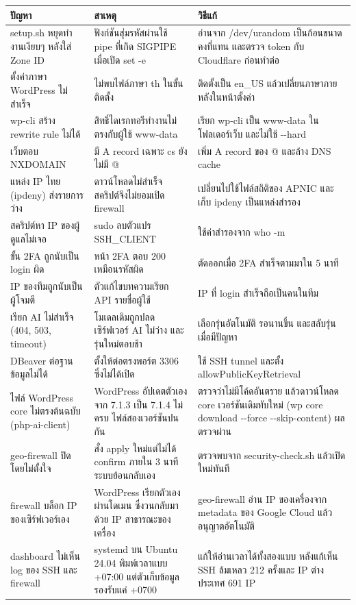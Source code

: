 \begingroup\small\begin{longtable}[]{@{}>{\raggedright\arraybackslash}p{}>{\raggedright\arraybackslash}p{}>{\raggedright\arraybackslash}p{}@{}}
\toprule\noalign{}
ปัญหา & สาเหตุ & วิธีแก้ \\
\midrule\noalign{}
\endhead
\bottomrule\noalign{}
\endlastfoot
setup.sh หยุดทำงานเงียบๆ หลังใส่ Zone ID & ฟังก์ชันสุ่มรหัสผ่านใช้ pipe ที่เกิด SIGPIPE เมื่อเปิด set -e & อ่านจาก /dev/urandom เป็นก้อนขนาดคงที่แทน และตรวจ token กับ Cloudflare ก่อนทำต่อ \\
ตั้งค่าภาษา WordPress ไม่สำเร็จ & ไม่พบไฟล์ภาษา th ในขั้นติดตั้ง & ติดตั้งเป็น en\_US แล้วเปลี่ยนภาษาภายหลังในหน้าตั้งค่า \\
wp-cli สร้าง rewrite rule ไม่ได้ & สิทธิ์ไดเรกทอรีทำงานไม่ตรงกับผู้ใช้ www-data & เรียก wp-cli เป็น www-data ในโฟลเดอร์เว็บ และไม่ใช้ -\/-hard \\
เว็บตอบ NXDOMAIN & มี A record เฉพาะ cs ยังไม่มี @ & เพิ่ม A record ของ @ และล้าง DNS cache \\
แหล่ง IP ไทย (ipdeny) ส่งรายการว่าง & ดาวน์โหลดไม่สำเร็จ สคริปต์จึงไม่ยอมเปิด firewall & เปลี่ยนไปใช้ไฟล์สถิติของ APNIC และเก็บ ipdeny เป็นแหล่งสำรอง \\
สคริปต์หา IP ของผู้ดูแลไม่เจอ & sudo ลบตัวแปร SSH\_CLIENT & ใช้ค่าสำรองจาก who -m \\
ขั้น 2FA ถูกนับเป็น login ผิด & หน้า 2FA ตอบ 200 เหมือนรหัสผิด & ตัดออกเมื่อ 2FA สำเร็จตามมาใน 5 นาที \\
IP ของทีมถูกนับเป็นผู้โจมตี & ตัวแก้ไขบทความเรียก API รายชื่อผู้ใช้ & IP ที่ login สำเร็จถือเป็นคนในทีม \\
เรียก AI ไม่สำเร็จ (404, 503, timeout) & โมเดลเดิมถูกปลด เซิร์ฟเวอร์ AI ไม่ว่าง และรุ่นใหม่ตอบช้า & เลือกรุ่นอัตโนมัติ รอนานขึ้น และสลับรุ่นเมื่อมีปัญหา \\
DBeaver ต่อฐานข้อมูลไม่ได้ & ตั้งให้ต่อตรงพอร์ต 3306 ซึ่งไม่ได้เปิด & ใช้ SSH tunnel และตั้ง allowPublicKeyRetrieval \\
ไฟล์ WordPress core ไม่ตรงต้นฉบับ (php-ai-client) & WordPress อัปเดตตัวเองจาก 7.1.3 เป็น 7.1.4 ไม่ครบ ไฟล์สองเวอร์ชันปนกัน & ตรวจว่าไม่มีโค้ดอันตราย แล้วดาวน์โหลด core เวอร์ชันเดิมทับใหม่ (wp core download -\/-force -\/-skip-content) ผลตรวจผ่าน \\
geo-firewall ปิดโดยไม่ตั้งใจ & สั่ง apply ใหม่แต่ไม่ได้ confirm ภายใน 3 นาที ระบบย้อนกลับเอง & ตรวจพบจาก security-check.sh แล้วเปิดใหม่ทันที \\
firewall บล็อก IP ของเซิร์ฟเวอร์เอง & WordPress เรียกตัวเองผ่านโดเมน ซึ่งวนกลับมาด้วย IP สาธารณะของเครื่อง & geo-firewall อ่าน IP ของเครื่องจาก metadata ของ Google Cloud แล้วอนุญาตอัตโนมัติ \\
dashboard ไม่เห็น log ของ SSH และ firewall & systemd บน Ubuntu 24.04 พิมพ์เวลาแบบ +07:00 แต่ตัวเก็บข้อมูลรองรับแค่ +0700 & แก้ให้อ่านเวลาได้ทั้งสองแบบ หลังแก้เห็น SSH ล้มเหลว 212 ครั้งและ IP ต่างประเทศ 691 IP \\
\end{longtable}\endgroup

